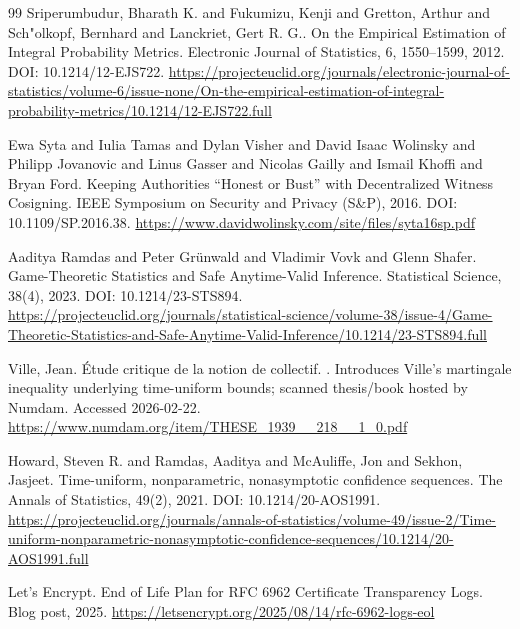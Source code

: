 \documentclass[11pt]{article}
\begin{document}
\begin{thebibliography}{99}
Sriperumbudur, Bharath K. and Fukumizu, Kenji and Gretton, Arthur and Sch{"o}lkopf, Bernhard and Lanckriet, Gert R. G..
\newblock On the Empirical Estimation of Integral Probability Metrics.
\newblock Electronic Journal of Statistics, 6, 1550--1599, 2012.
\newblock DOI: 10.1214/12-EJS722.
\newblock \url{https://projecteuclid.org/journals/electronic-journal-of-statistics/volume-6/issue-none/On-the-empirical-estimation-of-integral-probability-metrics/10.1214/12-EJS722.full}

Ewa Syta and Iulia Tamas and Dylan Visher and David Isaac Wolinsky and Philipp Jovanovic and Linus Gasser and Nicolas Gailly and Ismail Khoffi and Bryan Ford.
\newblock Keeping Authorities ``Honest or Bust'' with Decentralized Witness Cosigning.
\newblock IEEE Symposium on Security and Privacy (S\&P), 2016.
\newblock DOI: 10.1109/SP.2016.38.
\newblock \url{https://www.davidwolinsky.com/site/files/syta16sp.pdf}

Aaditya Ramdas and Peter Gr\"unwald and Vladimir Vovk and Glenn Shafer.
\newblock Game-Theoretic Statistics and Safe Anytime-Valid Inference.
\newblock Statistical Science, 38(4), 2023.
\newblock DOI: 10.1214/23-STS894.
\newblock \url{https://projecteuclid.org/journals/statistical-science/volume-38/issue-4/Game-Theoretic-Statistics-and-Safe-Anytime-Valid-Inference/10.1214/23-STS894.full}

Ville, Jean.
\newblock \'{E}tude critique de la notion de collectif.
.
\newblock Introduces Ville's martingale inequality underlying time-uniform bounds; scanned thesis/book hosted by Numdam. Accessed 2026-02-22.
\newblock \url{https://www.numdam.org/item/THESE_1939__218__1_0.pdf}

Howard, Steven R. and Ramdas, Aaditya and McAuliffe, Jon and Sekhon, Jasjeet.
\newblock Time-uniform, nonparametric, nonasymptotic confidence sequences.
\newblock The Annals of Statistics, 49(2), 2021.
\newblock DOI: 10.1214/20-AOS1991.
\newblock \url{https://projecteuclid.org/journals/annals-of-statistics/volume-49/issue-2/Time-uniform-nonparametric-nonasymptotic-confidence-sequences/10.1214/20-AOS1991.full}

{Let's Encrypt}.
\newblock End of Life Plan for RFC 6962 Certificate Transparency Logs.
\newblock Blog post, 2025.
\newblock \url{https://letsencrypt.org/2025/08/14/rfc-6962-logs-eol}


\end{thebibliography}
\end{document}
